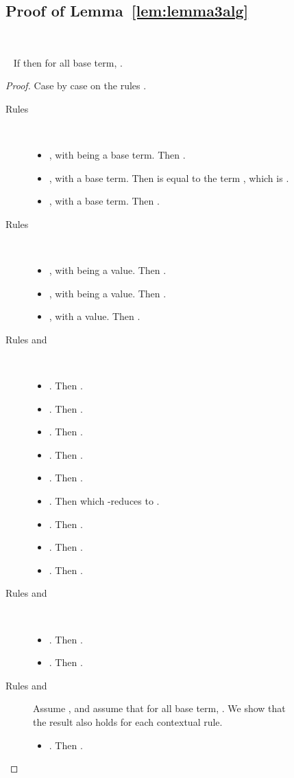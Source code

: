 \documentclass{LMCS}
\makeatletter
\newcommand{\recap}[2]{\medskip\noindent{\bf #1 \ref{#2}.}~}
\def\mynobreakpar{\par\nobreak\@afterheading}
\makeatother
\begin{document}
\begin{figure}
{\subsection{Proof of Lemma~\ref{lem:lemma3alg}}\label{proof:lemma3alg}~

\recap{Lemma}{lem:lemma3alg}
If  then for all  base term, .
\begin{proof}
  Case by case on the rules .
  \begin{description}
    \item[Rules ]~
      \begin{itemize}
	\item , with  being a base term. Then .
	\item , with  a base
	  term. Then  is equal to the term
	   , which is .
	\item , with  a base term. Then .
      \end{itemize}
    \item[Rules ]~\mynobreakpar
      \begin{itemize}
	\item , with  being a value. Then .
	\item , with  being a value. Then .
	\item , with  a value. Then .
      \end{itemize}
    \item[Rules  and ]~
      \begin{itemize}
	\item . Then .
	\item . Then .
	\item . Then  .
	\item . Then  .
	\item . Then  .
	\item . Then   which -reduces to .
	\item . Then .
	\item . Then  .
	\item . Then  .
      \end{itemize}
    \item[Rules  and ]~
      \begin{itemize}
	\item . Then .
	\item . Then .
      \end{itemize}
    \item[Rules  and ] Assume , and assume that for all  base term, . We show that the result also holds for each contextual rule.
      \begin{itemize}
	\item . Then .

\end{itemize}
\end{description}
\end{proof}}
\end{figure}
\end{document}
